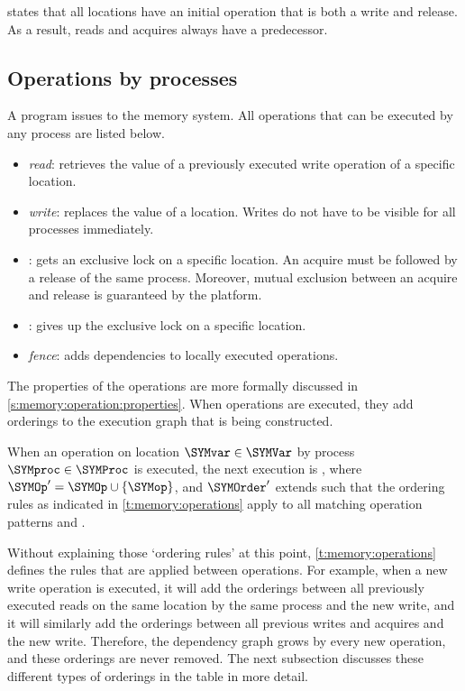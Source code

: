  states that all locations have an initial operation that is both a write and release.
As a result, reads and acquires always have a predecessor.

\subsection{Operations by processes}

A program issues  to the memory system.
All operations that can be executed by any process are listed below.
\begin{itemize}
\item \emph{read}: retrieves the value of a previously executed write operation of a specific location.
\item \emph{write}: replaces the value of a location.
	Writes do not have to be visible for all processes immediately.
\item \emph{}: gets an exclusive lock on a specific location.
	An acquire must be followed by a release of the same process.
	Moreover, mutual exclusion between an acquire and release is guaranteed by the platform.
\item \emph{}: gives up the exclusive lock on a specific location.
\item \emph{fence}: adds dependencies to locally executed operations.
\end{itemize}

The properties of the operations are more formally discussed in \cref{s:memory:operation:properties}.
When operations are executed, they add orderings to the execution graph that is being constructed.
\begin{definition}
	When an operation \SYMop on location $\SYMvar\in\SYMVar$ by process $\SYMproc\in\SYMProc$ is executed, the next execution is \SYMExecdef['], where
	$\SYMOp'=\SYMOp\cup\{\SYMop\}$, and $\SYMOrder'$ extends \SYMOrder such that the ordering rules as indicated in \vref{t:memory:operations} apply to all matching operation patterns and \SYMop.
\end{definition}

Without explaining those `ordering rules' at this point, \cref{t:memory:operations} defines the rules that are applied between operations.
For example, when a new write operation is executed, it will add the orderings \SYMorderlocal between all previously executed reads on the same location by the same process and the new write, and it will similarly add the orderings \SYMorderprog between all previous writes and acquires and the new write.
Therefore, the dependency graph grows by every new operation, and these orderings are never removed.
The next subsection discusses these different types of orderings in the table in more detail.

